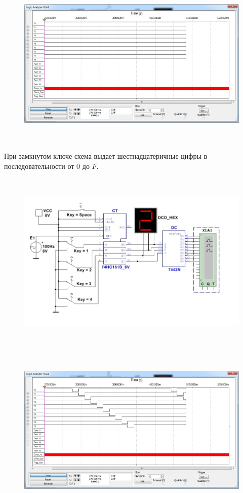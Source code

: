 \documentclass[spec, och, labwork]{shiza}
\begin{document}
\begin{figure}[H]
    \centering
    \includegraphics[width=5.83937in,height=3.21212in]{image3.jpeg}
\end{figure}

При замкнутом ключе схема выдает шестнадцатеричные цифры
в последовательности от 0 до $F$.

\begin{figure}[H]
    \centering
    \includegraphics[width=5.68277in,height=3.42424in]{image4.jpeg}
\end{figure}

\begin{figure}[H]
    \centering
    \includegraphics[width=5.64656in,height=3.10606in]{image5.jpeg}
\end{figure}
\end{document}
